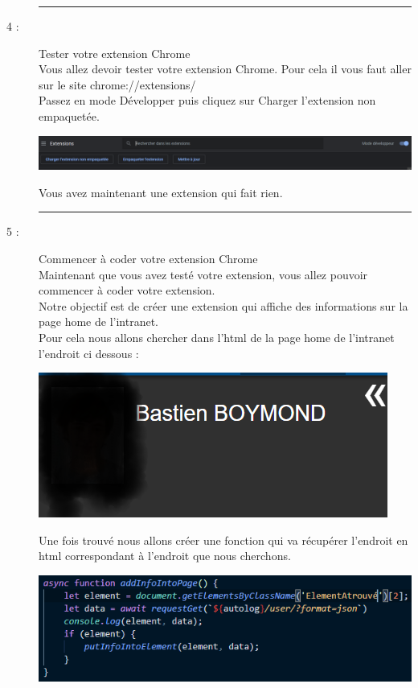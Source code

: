 \documentclass{article}
\begin{document}
\begin{description}
        \begin{center}
            \rule{0.75\linewidth}{1pt}
        \end{center}
        \item[4 :]{Tester votre extension Chrome} \\ Vous allez devoir tester votre extension Chrome. Pour cela il vous faut aller sur le site chrome://extensions/
        \\ Passez en mode Développer puis cliquez sur Charger l'extension non empaquetée.
        \begin{center}
            \includegraphics[scale=0.3]{HowToTestChorme.PNG}
        \end{center}
        Vous avez maintenant une extension qui fait rien.
        \begin{center}
            \rule{0.75\linewidth}{1pt}
        \end{center}
        \item[5 :]{Commencer à coder votre extension Chrome} \\ Maintenant que vous avez testé votre extension, vous allez pouvoir commencer à coder votre extension.
        \\ Notre objectif est de créer une extension qui affiche des informations sur la page home de l'intranet.
        \\ Pour cela nous allons chercher dans l'html de la page home de l'intranet l'endroit ci dessous :
        \begin{center}
            \includegraphics[scale=0.5]{FindInHtml.PNG}
        \end{center}
        Une fois trouvé nous allons créer une fonction qui va récupérer l'endroit en html correspondant à l'endroit que nous cherchons.
        \begin{center}
            \includegraphics[scale=0.8]{indexjspremierePartie.PNG}

\end{center}
\end{description}
\end{document}
